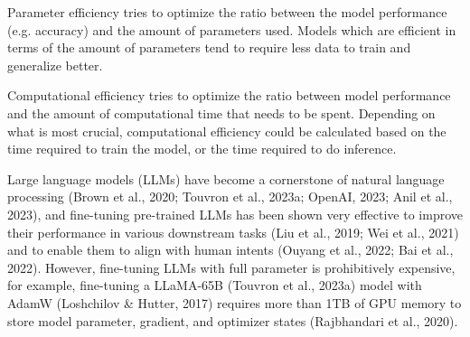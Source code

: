\documentclass[withindex,glossary,firstyr]{cam-thesis}
\begin{document}



Parameter efficiency tries to optimize the ratio between the model performance (e.g. accuracy) and the amount of parameters used. Models which are efficient in terms of the amount of parameters tend to require less data to train and generalize better.

Computational efficiency tries to optimize the ratio between model performance and the amount of computational time that needs to be spent. Depending on what is most crucial, computational efficiency could be calculated based on the time required to train the model, or the time required to do inference.



Large language models (LLMs) have become a cornerstone of natural language processing (Brown et al., 2020; Touvron et al., 2023a; OpenAI, 2023; Anil et al., 2023), and fine-tuning pre-trained LLMs has been shown very effective to improve their performance in various downstream tasks (Liu et al., 2019; Wei et al., 2021) and to enable them to align with human intents (Ouyang et al., 2022; Bai et al., 2022). However, fine-tuning LLMs with full parameter is prohibitively expensive, for example, fine-tuning a LLaMA-65B (Touvron et al., 2023a) model with AdamW (Loshchilov & Hutter, 2017) requires more than 1TB of GPU memory to store model parameter, gradient, and optimizer states (Rajbhandari et al., 2020).
\end{document}
